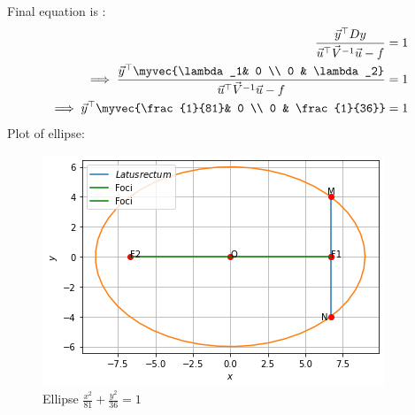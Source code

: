 \documentclass[journal,12pt,twocolumn]{IEEEtran}
\begin{document}
Final equation is :
\begin{align}
\frac{\vec{y}^{\top}Dy}{\vec{u}^{\top}\vec{V}^{-1}\vec{u}-f}=1\\
\implies \frac{\vec{y}^{\top}\myvec{\lambda_1& 0 \\ 0 & \lambda_2}}{\vec{u}^{\top}\vec{V}^{-1}\vec{u}-f} =1\\
\implies \vec{y}^{\top}\myvec{\frac{1}{81}& 0 \\ 0 & \frac{1}{36}}=1
\end{align}
Plot of ellipse:
\begin{figure}[H]
    \centering
    \includegraphics[width=\columnwidth]{ellipse.png}
    \caption{Ellipse $\frac{x^2}{81} + \frac{y^2}{36} = 1$}
    \label{fig:ellipse}
\end{figure}  
\end{document}
